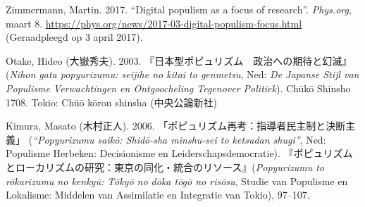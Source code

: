 \documentclass[10.5pt,dutch,]{article}
\begin{document}
\hypertarget{ref-zimmermannux5fdigitalux5f2017}{}
Zimmermann, Martin. 2017. “Digital populism as a focus of research”. \emph{Phys.org}, maart 8. \url{https://phys.org/news/2017-03-digital-populism-focus.html} (Geraadpleegd op 3 april 2017).

\hypertarget{ref-otakeux5fnihonux5f2003}{}
Otake, Hideo (大嶽秀夫). 2003. 『日本型ポピュリズム　政治への期待と幻滅』(\emph{Nihon gata popyurizumu: seijihe no kitai to genmetsu}, Ned: \emph{ De Japanse Stijl van Populisme Verwachtingen en Ontgoocheling Tegenover Politiek}). Chūkō Shinsho 1708. Tokio: Chūō kōron shinsha (中央公論新社)

\hypertarget{ref-kimuraux5fpopyurizumuux5f2006}{}
Kimura, Masato (木村正人). 2006. 「ポピュリズム再考：指導者民主制と決断主義」 (\emph{“Popyurizumu saikō: Shidō-sha minshu-sei to ketsudan shugi”}, Ned: Populisme Herbeken: Decisionisme en Leiderschapsdemocratie).  『ポピュリズムとローカリズムの研究：東京の同化・統合のリソース』(\emph{Popyurizumu to rōkarizumu no kenkyū: Tōkyō no dōka tōgō no risōsu}, Studie van Populisme en Lokalisme: Middelen van Assimilatie en Integratie van Tokio), 97–107.


\end{document}
